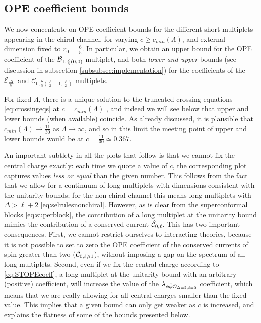 \subsection{OPE coefficient bounds}
\label{sec:OPEbounds}

We now concentrate on OPE-coefficient bounds for the different short multiplets appearing in the chiral channel, for varying $c \geqslant c_{min}(\Lambda)$, and external dimension fixed to $r_0=\frac65$. In particular, we obtain an upper bound for the OPE coefficient of the ${\mathcal{B}}_{1,\frac75(0,0)}$ multiplet, 
and both \emph{lower and upper} bounds (see discussion in subsection \ref{subsubsec:implementation}) for the coefficients of the ${\mathcal{E}}_{\frac{12}5}$ and $\mathcal{C}_{0,\frac75\left(\frac{\ell }{2}-1,\frac{\ell }{2}\right)}$ multiplets.

For fixed $\Lambda$, there is a unique solution to the truncated crossing equations \eqref{eq:crossingeqs} at $c=c_{min}(\Lambda)$ \cite{Poland:2010wg,ElShowk:2012hu}, and indeed we will see below that upper and lower bounds (when available) coincide. As already discussed, it is plausible that $c_{min}(\Lambda) \to \tfrac{11}{30}$ as $\Lambda \to \infty$, and so in this limit the meeting point of upper and lower bounds would be at $c=\frac{11}{30} \simeq 0.367$.


An important subtlety in all the plots that follow is that we cannot fix the central charge exactly: each time we quote a value of $c$, the corresponding plot captures values \textit{less or equal} than the given number. This follows from the fact that we allow for a continuum of long multiplets with dimensions consistent with the unitarity bounds; for the non-chiral channel this means long multiplets with $\Delta > \ell +2$ \eqref{eq:selrulesnonchiral}. However, as is clear from the superconformal blocks \eqref{eq:superblock}, the contribution of a long multiplet at the unitarity bound mimics the contribution of a conserved current $\hat{{\mathcal{C}}}_{0,\ell}$. This has two important consequences. First, we cannot restrict ourselves to interacting theories, because it is not possible to set to zero the OPE coefficient of the conserved currents of spin greater than two ($\hat{{\mathcal{C}}}_{0,\ell \geqslant 1}$), without imposing a gap on the spectrum of all long multiplets. Second, even if we fix the central charge according to \eqref{eq:STOPEcoeff}, a long multiplet at the unitarity bound with an arbitrary (positive) coefficient, will increase the value of the $\lambda_{\phi \bar{\phi} {\mathcal{O}}_{\Delta=2, \ell=0}}$ coefficient, which means that we are really allowing for all central charges smaller than the fixed value. This implies that a given bound can only get weaker as $c$ is increased, and explains the flatness of some of the bounds presented below.



